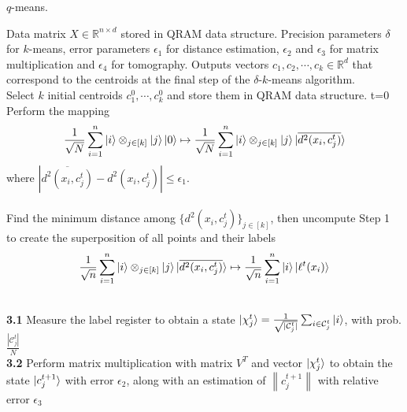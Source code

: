 \documentclass{article}
\newcommand{\errdist}{\epsilon_1}
\newcommand{\errmult}{\epsilon_2}
\newcommand{\errnorms}{\epsilon_3}
\newcommand{\errtom}{\epsilon_4}
\newcommand{\norm}[1]{\left\lVert#1\right\rVert}
\begin{document}
\pagestyle{empty}

\begin{algorithm}
	\caption{$q$-means.}
	\begin{algorithmic}[1]

	\Require  Data matrix $X \in \mathbb{R}^{n \times d}$ stored in QRAM data structure. Precision parameters $\delta$ for $k$-means, error parameters
	$\errdist$ for distance estimation, $\errmult$ and $\errnorms$ for matrix multiplication and $\errtom$ for tomography.
	\Ensure Outputs vectors $c_{1}, c_{2}, \cdots, c_{k} \in \mathbb{R}^{d}$ that correspond to the centroids at the final step of the $\delta$-$k$-means algorithm.\\
	\vspace{10pt}
	\Statex Select $k$ initial centroids $c_{1}^{0}, \cdots, c_{k}^{0}$ and store them in QRAM data structure.
	\State t=0
	\Repeat
	\\
	Perform the mapping
	\begin{equation}
	\frac{1}{\sqrt{N}}\sum_{i=1}^{n}   \ket{i} \otimes_{j \in [k]} \ket{j}\ket{0} \mapsto \frac{1}{\sqrt{N}}\sum_{i=1}^{n}  \ket{i} \otimes_{j \in [k]} \ket{j}\ket{\overline{d^2(x_{i}, c_{j}^{t})}}
	\end{equation}
	where $|\overline{d^2(x_{i}, c_{j}^{t})} -  d^2(x_{i}, c_{j}^{t}) | \leq \epsilon_{1}. $\\
	\\
	Find the minimum distance among $\{d^2(x_{i}, c_{j}^{t})\}_{j\in[k]}$, then uncompute Step 1 to create the superposition of all points and their labels
	\begin{equation}
	\frac{1}{\sqrt{n}}\sum_{i=1}^{n}  \ket{i} \otimes_{j \in [k]} \ket{j}\ket{\overline{d^2(x_{i}, c_{j}^{t})}}
	 \mapsto \frac{1}{\sqrt{n}}\sum_{i=1}^{n} \ket{i} \ket{ \ell^t(x_{i})}
	\end{equation}

	 \\
	{\bf 3.1} Measure the label register to obtain a state $\ket{\chi_{j}^t} = \frac{1}{ \sqrt{ |\mathcal{C}^t_{j}|} }  \sum_{i\in \mathcal{C}^t_j}\ket{i}$, with prob. $\frac{|\mathcal{C}^{t}_j|}{N} $ \\ %
	{\bf 3.2} Perform matrix multiplication with matrix $V^T$ and vector  $\ket{\chi_{j}^t}$  to obtain the state $\ket{c_{j}^{t+1}}$ with error $\errmult$, along with an estimation of $\norm{c_{j}^{t+1}}$ with relative error $\errnorms$ \\



\end{algorithmic}
\end{algorithm}
\end{document}
